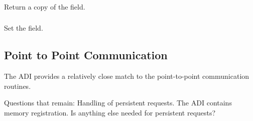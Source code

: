 \documentclass{article}
\begin{document}
\subsubsection{}
\subsubsection{}
\subsubsection{}
\subsubsection{}

\subsubsection{}
Return a copy of the  field.

\subsubsection{}
Set the  field.

\subsection{Point to Point Communication}

The ADI provides a relatively close match to the point-to-point
communication routines.  

Questions that remain:  Handling of persistent requests.  The ADI
contains memory registration.  Is anything else needed for persistent
requests? 

\subsubsection{}
\subsubsection{}
\subsubsection{}
\subsubsection{}
\end{document}
